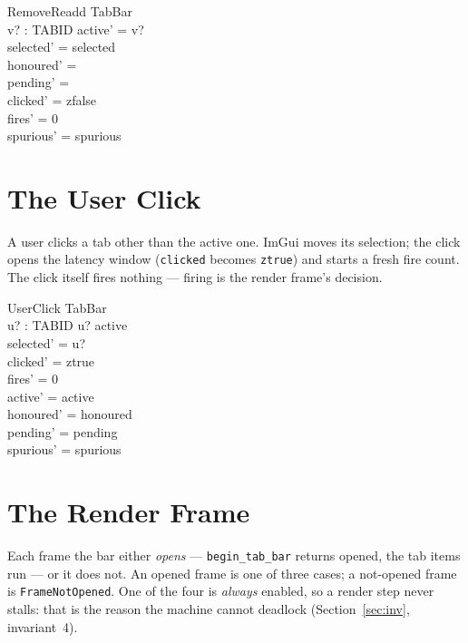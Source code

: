 \documentclass[a4paper,10pt,fleqn]{article}
\begin{document}
\begin{schema}{RemoveReadd}
  \Delta TabBar \\
  v? : TABID
\where
  active' = v? \\
  selected' = selected \\
  honoured' = \emptyset \\
  pending' = \emptyset \\
  clicked' = zfalse \\
  fires' = 0 \\
  spurious' = spurious
\end{schema}

\section{The User Click}

A user clicks a tab other than the active one.  ImGui moves its selection;
the click opens the latency window (\texttt{clicked} becomes \texttt{ztrue})
and starts a fresh fire count.  The click itself fires nothing --- firing is
the render frame's decision.

\begin{schema}{UserClick}
  \Delta TabBar \\
  u? : TABID
\where
  u? \neq active \\
  selected' = u? \\
  clicked' = ztrue \\
  fires' = 0 \\
  active' = active \\
  honoured' = honoured \\
  pending' = pending \\
  spurious' = spurious
\end{schema}

\section{The Render Frame}

Each frame the bar either \emph{opens} --- \texttt{begin\_tab\_bar} returns
opened, the tab items run --- or it does not.  An opened frame is one of three
cases; a not-opened frame is \texttt{FrameNotOpened}.  One of the four is
\emph{always} enabled, so a render step never stalls: that is the reason the
machine cannot deadlock (Section~\ref{sec:inv}, invariant~4).
\end{document}
